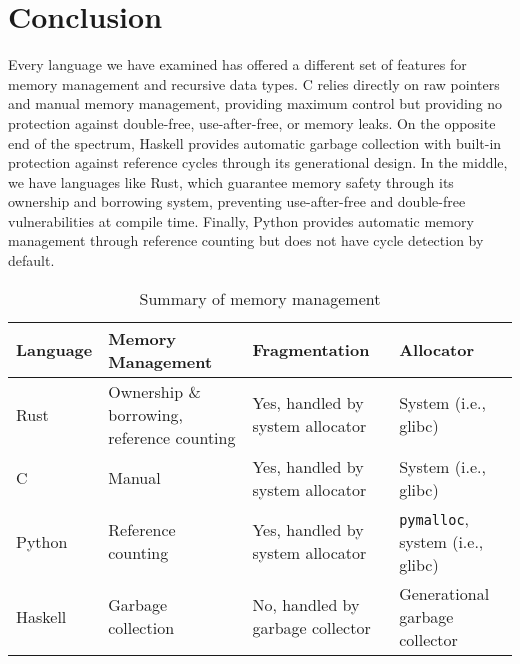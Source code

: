 \documentclass[12pt, letterpaper]{article}
\begin{document}
\section{Conclusion}
Every language we have examined has offered a different set of features for memory management and recursive data types. C relies directly on raw pointers and manual memory management, providing maximum control but providing no protection against double-free, use-after-free, or memory leaks. On the opposite end of the spectrum, Haskell provides automatic garbage collection with built-in protection against reference cycles through its generational design. In the middle, we have languages like Rust, which guarantee memory safety through its ownership and borrowing system, preventing use-after-free and double-free vulnerabilities at compile time. Finally, Python provides automatic memory management through reference counting but does not have cycle detection by default.
\begin{table}[H]
	\centering
	\begin{tabular}{p{2cm}|p{3cm}|p{4cm}|p{3cm}}
		Language & Memory Management                          & Fragmentation                    & Allocator                               \\
		\hline
		Rust     & Ownership \& borrowing, reference counting & Yes, handled by system allocator & System (i.e., glibc)                    \\
		\hline
		C        & Manual                                     & Yes, handled by system allocator & System (i.e., glibc)                    \\
		\hline
		Python   & Reference counting                         & Yes, handled by system allocator & \texttt{pymalloc}, system (i.e., glibc) \\
		\hline
		Haskell  & Garbage collection                         & No, handled by garbage collector & Generational garbage collector          \\
	\end{tabular}
	\caption{Summary of memory management}
\end{table}
\end{document}
